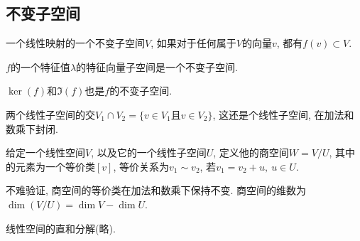 
\subsection{不变子空间}

\begin{definition}
    一个线性映射的一个不变子空间$V$, 如果对于任何属于$V$的向量$v$, 都有$f\left( v \right) \subset V$.
\end{definition}
\begin{example}
    $f$的一个特征值$\lambda$的特征向量子空间是一个不变子空间.
\end{example}
\begin{example}
    $\ker \left( f \right) $和$\Im \left( f \right) $也是$f$的不变子空间.
\end{example}

\begin{definition}
    两个线性子空间的交$V_1 \cap V_2 = \{ v \in V_1 \text{且} v \in V_2 \}$, 这还是个线性子空间, 在加法和数乘下封闭.
\end{definition}

\begin{definition}
    给定一个线性空间$V$, 以及它的一个线性子空间$U$, 定义他的商空间$W = V / U$, 其中的元素为一个等价类$[v]$, 等价关系为$v_1 \sim v_2$, 若$v_1 = v_2 + u,\ u \in U$.
\end{definition}
不难验证, 商空间的等价类在加法和数乘下保持不变.
商空间的维数为$\operatorname{dim} \left( V / U \right) =\operatorname{dim} V - \operatorname{dim} U$.

线性空间的直和分解(略).